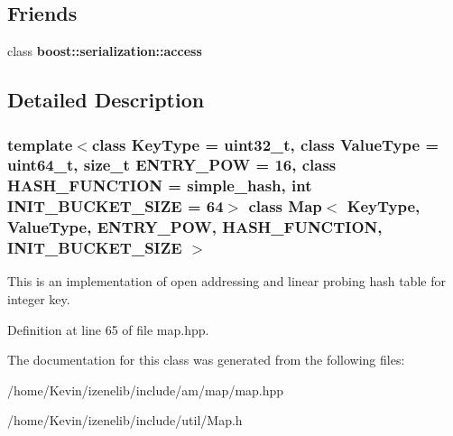 \subsection*{Friends}
\begin{CompactItemize}
\item 
\hypertarget{classMap_c98d07dd8f7b70e16ccb9a01abf56b9c}{
class \textbf{boost::serialization::access}}
\label{classMap_c98d07dd8f7b70e16ccb9a01abf56b9c}

\end{CompactItemize}


\subsection{Detailed Description}
\subsubsection*{template$<$class KeyType = uint32\_\-t, class ValueType = uint64\_\-t, size\_\-t ENTRY\_\-POW = 16, class HASH\_\-FUNCTION = simple\_\-hash, int INIT\_\-BUCKET\_\-SIZE = 64$>$ class Map$<$ KeyType, ValueType, ENTRY\_\-POW, HASH\_\-FUNCTION, INIT\_\-BUCKET\_\-SIZE $>$}

This is an implementation of open addressing and linear probing hash table for integer key. 

Definition at line 65 of file map.hpp.

The documentation for this class was generated from the following files:\begin{CompactItemize}
\item 
/home/Kevin/izenelib/include/am/map/map.hpp\item 
/home/Kevin/izenelib/include/util/Map.h\end{CompactItemize}
